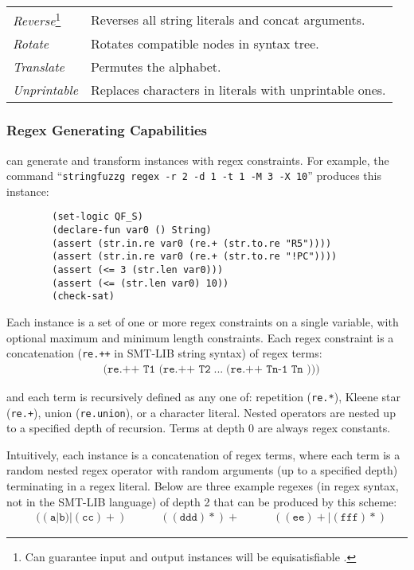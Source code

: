 \begin{table}[t]
\begin{subtable}{1\textwidth}
\begin{tabular}{l l}
            \textit{Reverse}\footnote{Can guarantee input and output
            instances will be equisatisfiable \cite{website}.}
            & Reverses all string literals and concat arguments.\\
            \textit{Rotate}
            & Rotates compatible nodes in syntax tree.\\
            \textit{Translate}\footnotemark[6]
            & Permutes the alphabet.\\
            \textit{Unprintable}
            & Replaces characters in literals with unprintable ones.\\
            \bottomrule
        \end{tabular}
    \end{subtable}
\end{table}

\subsubsection{Regex Generating Capabilities}

\fuzzer{} can generate and transform instances with regex
constraints. For example, the command
``\texttt{stringfuzzg regex -r 2 -d 1 -t 1 -M 3 -X 10}'' produces this instance:
{\small\begin{verbatim}        (set-logic QF_S)
        (declare-fun var0 () String)
        (assert (str.in.re var0 (re.+ (str.to.re "R5"))))
        (assert (str.in.re var0 (re.+ (str.to.re "!PC"))))
        (assert (<= 3 (str.len var0)))
        (assert (<= (str.len var0) 10))
        (check-sat)\end{verbatim}}

Each instance is a set of one or more regex constraints on a single
variable, with optional maximum and minimum length constraints. Each regex
constraint is a concatenation (\texttt{re.++} in SMT-LIB string syntax)
of regex terms:
\begin{align*}
    & \texttt{(re.++ T1 (re.++ T2} \; ... \; \texttt{(re.++ Tn-1 Tn )))}
\end{align*}

\noindent and each term is recursively defined as any one of: repetition
(\texttt{re.*}), Kleene star (\texttt{re.+}), union (\texttt{re.union}), or a
character literal. Nested operators are nested up to a specified depth of
recursion. Terms at depth 0 are always regex constants.

Intuitively, each instance is a concatenation of regex terms, where each
term is a random nested regex operator with random arguments
(up to a specified depth) terminating in a regex literal.
Below are three example regexes (in regex syntax, not in the SMT-LIB language)
of depth 2 that can be produced by this scheme:
\begin{align*}
    & ((\texttt{a}|\texttt{b})|(\texttt{cc})+)\quad\quad\quad
    ((\texttt{ddd})*)+\quad\quad\quad ((\texttt{ee})+|(\texttt{fff})*)
\end{align*}

